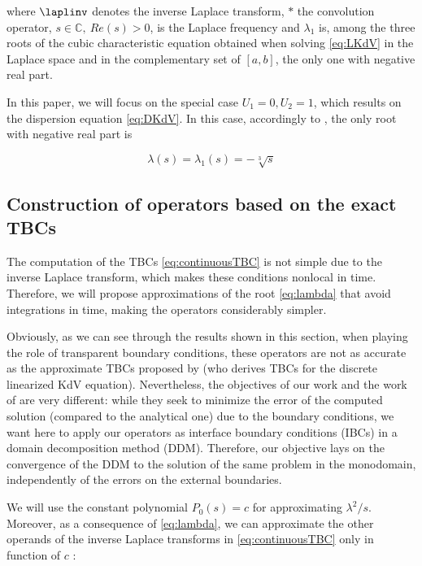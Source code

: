 \noindent where $\laplinv$ denotes the inverse Laplace transform, $*$ the convolution operator, $s \in \mathbb{C}, \ Re(s)>0$, is the Laplace frequency and $\lambda_1$ is, among the three roots of the cubic characteristic equation obtained when solving \eqref{eq:LKdV} in the Laplace space and in the complementary set of $[a,b]$, the only one with negative real part.

\indent In this paper, we will focus on the special case $U_1 = 0, U_2 = 1$, which results on the dispersion equation \eqref{eq:DKdV}. In this case, accordingly to \cite{zheng2008}, the only root with negative real part is 

\begin{equation}
	\label{eq:lambda}
			\lambda(s) = \lambda_1(s) =  -\sqrt[3]{s} 
\end{equation}

\subsection{Construction of operators based on the exact TBCs}

\indent The computation of the TBCs \eqref{eq:continuousTBC} is not simple due to the inverse Laplace transform, which makes these conditions nonlocal in time. Therefore, we will propose approximations of the root \eqref{eq:lambda} that avoid integrations in time, making the operators considerably simpler.

\indent Obviously, as we can see through the results shown in this section,  when playing the role of transparent boundary conditions, these operators are not as accurate as the approximate TBCs proposed by \cite{besse2015} (who derives TBCs for the discrete linearized KdV equation). Nevertheless, the objectives of our work and the work of \cite{besse2015} are very different: while they seek to minimize the error of the computed solution (compared to the analytical one) due to the boundary conditions, we want here to apply our  operators as interface boundary conditions (IBCs) in a domain decomposition method (DDM). Therefore, our objective lays on the convergence of the DDM to the solution of the same problem in the monodomain, independently of the errors on the external boundaries. 

\indent We will use the constant polynomial $P_0(s) = c$ for approximating $\lambda^2/s$. Moreover, as a consequence of \eqref{eq:lambda}, we can approximate the other operands of the inverse Laplace transforms in \eqref{eq:continuousTBC} only in function of $c$ :

